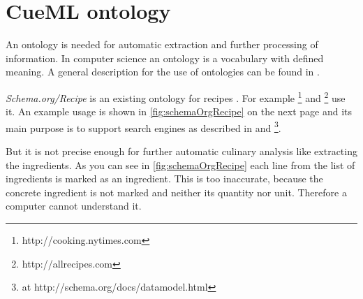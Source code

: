 \documentclass[12pt, twoside]{report}
\begin{document}
\section{CueML ontology}\label{sec:cueMLOntology}
An ontology is needed for automatic extraction and further processing of information. In computer science an ontology is a vocabulary with defined meaning. A general description for the use of ontologies can be found in \parencite{semanticWeb}.

\textit{Schema.org/Recipe} is an existing ontology for recipes \parencite{schemaOrg}. For example \footnote{http://cooking.nytimes.com} and \footnote{http://allrecipes.com} use it. An example usage is shown in \cref{fig:schemaOrgRecipe} on the next page and its main purpose is to support search engines as described in \parencite{foodBlogger} and \parencite{schemaOrg} \footnote{at http://schema.org/docs/datamodel.html}.

But it is not precise enough for further automatic culinary analysis like extracting the ingredients. As you can see in \cref{fig:schemaOrgRecipe} each line from the list of ingredients is marked as an ingredient. This is too inaccurate, because the concrete ingredient is not marked and neither its quantity nor unit. Therefore a computer cannot understand it.
\end{document}
